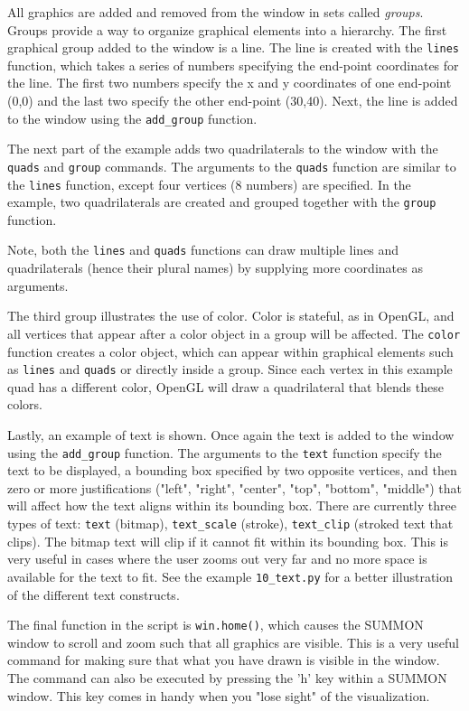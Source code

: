 \documentclass[12pt]{article}
\newcommand{\code}[1]{{\tt #1}}
\begin{document}
All graphics are added and removed from the window in sets called {\em groups}. 
Groups provide a way to organize graphical elements into a hierarchy.
The first graphical group added to the window is a line.
The line is created with the \code{lines} function, which takes a series of
numbers specifying the end-point coordinates for the line.  The first
two numbers specify the x and y coordinates of one end-point (0,0) and the last
two specify the other end-point (30,40).  Next, the line is added to the window
using the \code{add\_group} function.

The next part of the example adds two quadrilaterals to the window with the
\code{quads} and \code{group} commands.  The arguments to the \code{quads}
function are similar to the \code{lines} function, except four vertices (8
numbers) are specified.  In the example, two quadrilaterals are created and
grouped together with the \code{group} function.

Note, both the \code{lines} and \code{quads} functions can draw multiple lines
and quadrilaterals (hence their plural names) by supplying more coordinates as
arguments.

The third group illustrates the use of color.  Color is stateful, as in OpenGL,
and all vertices that appear after a color object in a group will be affected. 
The \code{color} function creates a color object, which can appear
within graphical elements such as \code{lines} and \code{quads} or directly
inside a group.  Since each vertex in this example quad has a different color,
OpenGL will draw a quadrilateral that blends these colors.

Lastly, an example of text is shown.  Once again the text is added to the window
using the \code{add\_group} function.  The arguments to the \code{text} function
specify the text to be displayed, a bounding box specified by two
opposite  vertices, and then zero or more justifications ("left", "right",
"center", "top", "bottom", "middle") that will affect how the text aligns 
within its bounding box.  There are currently three types of text: \code{text}
(bitmap), \code{text\_scale} (stroke), \code{text\_clip} (stroked text that
clips).  The bitmap text will clip if it cannot fit within its bounding box. 
This is very useful in cases where the user zooms out very far and no more space
is available for the text to fit.  See the example \code{10\_text.py} for a
better illustration of the different text constructs.

The final function in the script is \code{win.home()}, which causes
the SUMMON window to scroll and zoom such that all graphics are visible.  This
is a very useful command for making sure that what you have drawn is visible in
the window.  The command can also be executed by pressing the 'h' key within a
SUMMON window.  This key  comes in handy when you "lose sight" of the
visualization.
\end{document}
